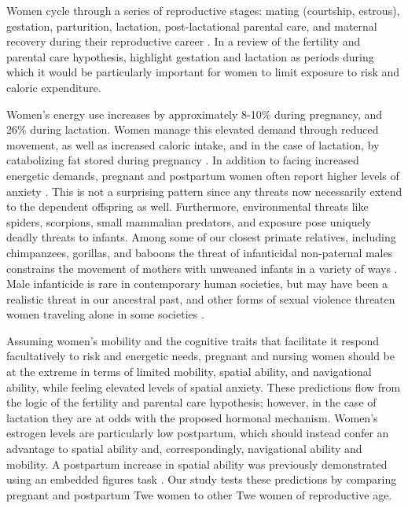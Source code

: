 Women cycle through a series of reproductive stages: mating (courtship, estrous), gestation, parturition, lactation, post-lactational parental care, and maternal recovery during their reproductive career \citep{gittleman1988energy}.  In a review of the fertility and parental care hypothesis, \citet{jones2003evolution} highlight gestation and lactation as periods during which it would be particularly important for women to limit exposure to risk and caloric expenditure.  

Women's energy use increases by approximately 8-10\% during pregnancy, and 26\% during lactation.  Women manage this elevated demand through reduced movement, as well as increased caloric intake, and in the case of lactation, by catabolizing fat stored during pregnancy \citep{dufour2002comparative}.  In addition to facing increased energetic demands, pregnant and postpartum women often report higher levels of anxiety \citep{heron2004course, wenzel2003prevalence}.  This is not a surprising pattern since any threats now necessarily extend to the dependent offspring as well.  Furthermore, environmental threats like spiders, scorpions, small mammalian predators, and exposure pose uniquely deadly threats to infants.  Among some of our closest primate relatives, including chimpanzees, gorillas, and baboons the threat of infanticidal non-paternal males constrains the movement of mothers with unweaned infants in a variety of ways \citep{collins1984infanticide, watts1989infanticide, smuts1992male, stokes2003female, watts2000infanticide}.  Male infanticide is rare in contemporary human societies, but may have been a realistic threat in our ancestral past, and other forms of sexual violence threaten women traveling alone in some societies \citep{gregor1987anxious}.

\label{lact_disc}
Assuming women's mobility and the cognitive traits that facilitate it respond facultatively to risk and energetic needs, pregnant and nursing women should be at the extreme in terms of limited mobility, spatial ability, and navigational ability, while feeling elevated levels of spatial anxiety.  These predictions flow from the logic of the fertility and parental care hypothesis; however, in the case of lactation they are at odds with the proposed hormonal mechanism.  Women's estrogen levels are particularly low postpartum, which should instead confer an advantage to spatial ability and, correspondingly, navigational ability and mobility.  A postpartum increase in spatial ability was previously demonstrated using an embedded figures task \citep{woodfield1984embedded}.  Our study tests these predictions by comparing pregnant and postpartum Twe women to other Twe women of reproductive age.

